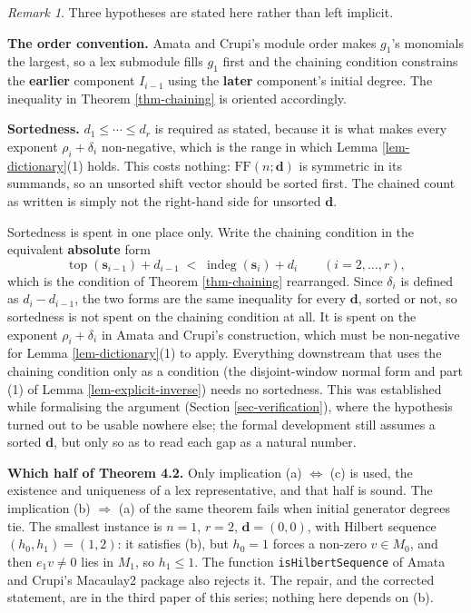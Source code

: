 \documentclass[11pt, a4paper, abstract=yes]{scrartcl}
\theoremstyle{definition}
\theoremstyle{remark}
\newtheorem{remark}[definition]{Remark}
\theoremstyle{plain}
\newcommand{\vek}[1]{\boldsymbol{#1}}
\newcommand{\indeg}{\operatorname{indeg}}
\newcommand{\tp}{\operatorname{top}}
\let\autocite\cite
\begin{document}
\begin{remark}
Three hypotheses are stated here rather than left implicit.

\textbf{The order convention.} Amata and Crupi's module order makes \(g_1\)'s monomials the largest, so a
lex submodule fills \(g_1\) first and the chaining condition constrains the \textbf{earlier} component
\(I_{i-1}\) using the \textbf{later} component's initial degree. The inequality in Theorem \ref{thm-chaining}
is oriented accordingly.

\textbf{Sortedness.} \(d_1\le\cdots\le d_r\) is required as stated, because it is what makes every exponent
\(\rho_i+\delta_i\) non-negative, which is the range in which Lemma \ref{lem-dictionary}(1) holds. This
costs nothing: \(\mathrm{FF}(n;\vek d)\) is symmetric in its summands, so an unsorted shift vector should be
sorted first. The chained count as written is simply not the right-hand side for unsorted \(\vek d\).

Sortedness is spent in one place only.
Write the chaining condition in the equivalent \textbf{absolute} form
\begin{equation}\label{eq:chaining-absolute}
  \tp(\vek s_{i-1})+d_{i-1}\;<\;\indeg(\vek s_i)+d_i \qquad(i=2,\dots,r),
\end{equation}
which is the condition of Theorem \ref{thm-chaining} rearranged. Since \(\delta_i\) is defined as
\(d_i-d_{i-1}\), the two forms are the same inequality for every \(\vek d\), sorted or not, so
sortedness is not spent on the chaining condition at all. It is spent on the exponent
\(\rho_i+\delta_i\) in Amata and Crupi's construction, which must be non-negative for
Lemma \ref{lem-dictionary}(1) to apply. Everything downstream that uses the chaining condition only as
a condition (the disjoint-window normal form and part (1) of Lemma
\ref{lem-explicit-inverse}) needs no sortedness. This was established while formalising the argument
(Section \ref{sec-verification}), where the hypothesis turned out to be usable nowhere else; the
formal development still assumes a sorted \(\vek d\), but only so as to read each gap as a natural
number.

\textbf{Which half of Theorem 4.2.} Only implication (a) \(\Leftrightarrow\) (c) is used, the existence
and uniqueness of a lex representative, and that half is sound. The implication (b) \(\Rightarrow\) (a) of the same
theorem fails when initial generator degrees tie. The smallest instance is \(n=1\), \(r=2\),
\(\vek d=(0,0)\), with Hilbert sequence \((h_0,h_1)=(1,2)\): it satisfies (b), but \(h_0=1\) forces a
non-zero \(v\in M_0\), and then \(e_1v\ne0\) lies in \(M_1\), so \(h_1\le1\). The function
\texttt{isHilbertSequence} of Amata and Crupi's Macaulay2 package \autocite{AmataCrupi2021} also rejects it.
The repair, and the corrected statement, are in the third paper of this series; nothing here
depends on (b).
\label{rem-sorted}
\end{remark}
\end{document}

